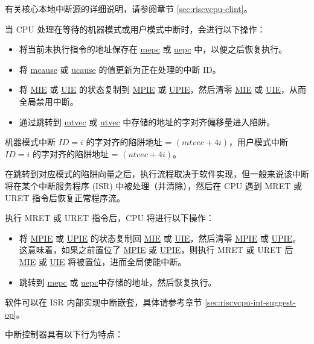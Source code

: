 \documentclass[main\_\_CN.tex]{subfiles}
\begin{document}
有关核心本地中断源的详细说明，请参阅章节 \ref{sec:riscvcpu-clint}。

当 CPU 处理在等待的机器模式或用户模式中断时，会进行以下操作：
\begin{itemize}
    \item 将当前未执行指令的地址保存在 \hyperref[regdesc:MEPC]{mepc} 或 \hyperref[regdesc:UEPC]{uepc} 中，以便之后恢复执行。
    \item 将 \hyperref[regdesc:MCAUSE]{mcause} 或 \hyperref[regdesc:UCAUSE]{ucause} 的值更新为正在处理的中断 ID。
    \item 将 \hyperref[fielddesc:MSTATUSMIE]{MIE} 或 \hyperref[fielddesc:USTATUSUIE]{UIE} 的状态复制到 \hyperref[fielddesc:MSTATUSMPIE]{MPIE} 或 \hyperref[fielddesc:USTATUSUPIE]{UPIE}，然后清零 \hyperref[fielddesc:MSTATUSMIE]{MIE} 或 \hyperref[fielddesc:USTATUSUIE]{UIE}，从而全局禁用中断。
    \item 通过跳转到 \hyperref[regdesc:MTVEC]{mtvec} 或 \hyperref[regdesc:UTVEC]{utvec} 中存储的地址的字对齐偏移量进入陷阱。
\end{itemize}

机器模式中断 $ID=i$ 的字对齐的陷阱地址 = $(\hyperref[fielddesc:MTVECBASE]{mtvec} + 4i)$，用户模式中断 $ID=i$ 的字对齐的陷阱地址 = $(\hyperref[fielddesc:UTVECBASE]{utvec} + 4i)$。

在跳转到对应模式的陷阱向量之后，执行流程取决于软件实现，但一般来说该中断将在某个中断服务程序 (ISR) 中被处理（并清除），然后在 CPU 遇到 MRET 或 URET 指令后恢复正常程序流。

执行 MRET 或 URET 指令后，CPU 将进行以下操作：
\begin{itemize}
    \item 将 \hyperref[fielddesc:MSTATUSMPIE]{MPIE} 或 \hyperref[fielddesc:MSTATUSUPIE]{UPIE} 的状态复制回 \hyperref[fielddesc:MSTATUSMIE]{MIE} 或 \hyperref[fielddesc:USTATUSUIE]{UIE}，然后清零 \hyperref[fielddesc:MSTATUSMPIE]{MPIE} 或 \hyperref[fielddesc:USTATUSUPIE]{UPIE}。这意味着，如果之前置位了 \hyperref[fielddesc:MSTATUSMPIE]{MPIE} 或 \hyperref[fielddesc:USTATUSUPIE]{UPIE}，则执行 MRET 或 URET 后 \hyperref[fielddesc:MSTATUSMIE]{MIE} 或 \hyperref[fielddesc:USTATUSUIE]{UIE} 将被置位，进而全局使能中断。
    \item 跳转到 \hyperref[regdesc:MEPC]{mepc} 或 \hyperref[regdesc:UEPC]{uepc}中存储的地址，然后恢复执行。
\end{itemize}

软件可以在 ISR 内部实现中断嵌套，具体请参考章节 \ref{sec:riscvcpu-int-suggest-op}。

中断控制器具有以下行为特点：
\end{document}
